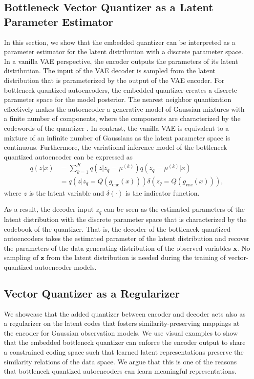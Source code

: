 \documentclass[letterpaper]{article} %
\begin{document}
\subsection{Bottleneck Vector Quantizer as a Latent Parameter Estimator}
In this section, we show that the embedded quantizer can be interpreted as a parameter estimator for the latent distribution with a discrete parameter space. In a vanilla VAE perspective, the encoder outputs the parameters of its latent distribution. The input of the VAE decoder is sampled from the latent distribution that is parameterized by the output of the VAE encoder. For bottleneck quantized autoencoders, the embedded quantizer creates a discrete parameter space for the model posterior. The nearest neighbor quantization effectively makes the autoencoder a generative model of Gaussian mixtures with a finite number of components, where the components are characterized by the codewords of the quantizer \cite{Henter2018}. In contrast, the vanilla VAE is equivalent to a mixture of an infinite number of Gaussians as the latent parameter space is continuous. Furthermore, the variational inference model of the bottleneck quantized autoencoder can be expressed as
	\begin{align}
	q(z|x) &= \sum_{k = 1}^Kq\left(z|z_q = \mu^{(k)}\right)q\left(z_q = \mu^{(k)}|x\right) \\
	&= q\left(z|z_q = Q(g_{\text{enc}}(x))\right)\delta\left(z_q = Q(g_{\text{enc}}(x))\right),
	\end{align}
	where $z$ is the latent variable and $\delta(\cdot)$ is the indicator function. 

As a result, the decoder input $z_q$ can be seen as the estimated parameters of the latent distribution with the discrete parameter space that is characterized by the codebook of the quantizer. That is, the decoder of the bottleneck quantized autoencoders takes the estimated parameter of the latent distribution and recover the parameters of the data generating distribution of the observed variables $\mathbf{x}$. No sampling of $\mathbf{z}$ from the latent distribution is needed during the training of vector-quantized autoencoder models.
\subsection{Vector Quantizer as a Regularizer}
We showcase that the added quantizer between encoder and decoder acts also as a regularizer on the latent codes that fosters similarity-preserving mappings at the encoder for Gaussian observation models. We use visual examples to show that the embedded bottleneck quantizer can enforce the encoder output to share a constrained coding space such that learned latent representations preserve the similarity relations of the data space. We argue that this is one of the reasons that bottleneck quantized autoencoders can learn meaningful representations. 
\end{document}
